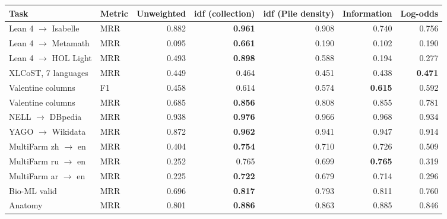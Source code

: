 \begin{tabular}{@{}llrrrrr@{}}
\toprule
Task & Metric & Unweighted & \textbf{idf (collection)} & idf (Pile density) & Information & Log-odds \\
\midrule
Lean 4 $\to$ Isabelle & MRR & 0.882 & \textbf{0.961} & 0.908 & 0.740 & 0.756 \\
Lean 4 $\to$ Metamath & MRR & 0.095 & \textbf{0.661} & 0.190 & 0.102 & 0.190 \\
Lean 4 $\to$ HOL Light & MRR & 0.493 & \textbf{0.898} & 0.588 & 0.194 & 0.277 \\
XLCoST, 7 languages & MRR & 0.449 & 0.464 & 0.451 & 0.438 & \textbf{0.471} \\
Valentine columns & F1 & 0.458 & 0.614 & 0.574 & \textbf{0.615} & 0.592 \\
Valentine columns & MRR & 0.685 & \textbf{0.856} & 0.808 & 0.855 & 0.781 \\
NELL $\to$ DBpedia & MRR & 0.938 & \textbf{0.976} & 0.966 & 0.968 & 0.934 \\
YAGO $\to$ Wikidata & MRR & 0.872 & \textbf{0.962} & 0.941 & 0.947 & 0.914 \\
MultiFarm zh $\to$ en & MRR & 0.404 & \textbf{0.754} & 0.710 & 0.726 & 0.509 \\
MultiFarm ru $\to$ en & MRR & 0.252 & 0.765 & 0.699 & \textbf{0.765} & 0.319 \\
MultiFarm ar $\to$ en & MRR & 0.225 & \textbf{0.722} & 0.679 & 0.714 & 0.296 \\
Bio-ML valid & MRR & 0.696 & \textbf{0.817} & 0.793 & 0.811 & 0.760 \\
Anatomy & MRR & 0.801 & \textbf{0.886} & 0.863 & 0.885 & 0.846 \\
\bottomrule
\end{tabular}
